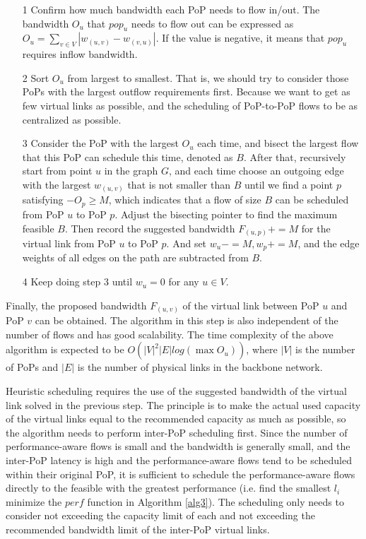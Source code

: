 \begin{itemize}[leftmargin=*] 
\item[1] Confirm how much bandwidth each PoP needs to flow in/out. The bandwidth $O_u$ that $pop_u$ needs to flow out can be expressed as $O_u=\sum_{v\in V} |w_{(u,v)}-w_{(v,u)}| $. If the value is negative, it means that $pop_u$ requires inflow bandwidth.
\item[2] Sort $O_u$ from largest to smallest. That is, we should try to consider those PoPs with the largest outflow requirements first. Because we want to get as few virtual links as possible, and the scheduling of PoP-to-PoP flows to be as centralized as possible.
\item[3] Consider the PoP with the largest $O_u$ each time, and bisect the largest flow that this PoP can schedule this time, denoted as $B$. After that, recursively start from point $u$ in the graph $G$, and each time choose an outgoing edge with the largest $w_{(u,v)}$ that is not smaller than $B$ until we find a point $p$ satisfying $-O_p\ge M$, which indicates that a flow of size $B$ can be scheduled from PoP $u$ to PoP $p$. Adjust the bisecting pointer to find the maximum feasible $B$. Then record the suggested bandwidth $F_{(u,p)}+=M$ for the virtual link from PoP $u$ to PoP $p$. And set $w_u-=M,w_p+=M$, and the edge weights of all edges on the path are subtracted from $B$.
\item[4] Keep doing step 3 until $w_u=0$ for any $u\in V$.
\end{itemize}

{Finally, the proposed bandwidth $F_{(u,v)}$ of the virtual link between PoP $u$ and PoP $v$ can be obtained. The algorithm in this step is also independent of the number of flows and has good scalability. The time complexity of the above algorithm is expected to be $O(|V|^2 |E| log(\max O_u))$, where $|V|$ is the number of PoPs and $|E|$ is the number of physical links in the backbone network.}


{ Heuristic scheduling requires the use of the suggested bandwidth of the virtual link solved in the previous step. The principle is to make the actual used capacity of the virtual links equal to the recommended capacity as much as possible, so the algorithm needs to perform inter-PoP scheduling first. Since the number of performance-aware flows is small and the bandwidth is generally small, and the inter-PoP latency is high and the performance-aware flows tend to be scheduled within their original PoP, it is sufficient to schedule the performance-aware flows directly to the feasible {\egress} with the greatest performance (i.e. find the smallest {\egress} $l_i$ minimize the $perf$ function in Algorithm \ref{alg3}). The scheduling only needs to consider not exceeding the capacity limit of each {\egress} and not exceeding the recommended bandwidth limit of the inter-PoP virtual links.}


